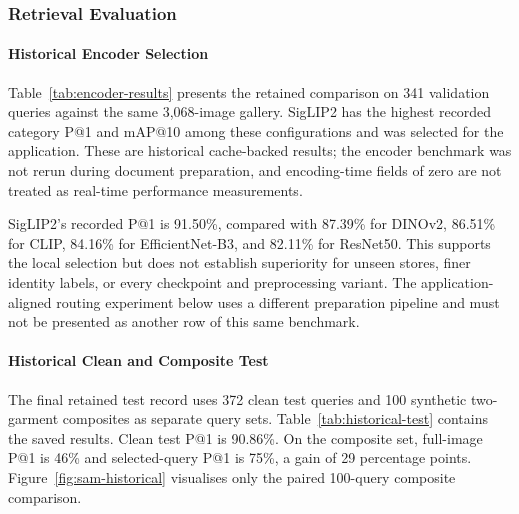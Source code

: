 \subsubsection{Retrieval Evaluation}
\paragraph{Historical Encoder Selection}
Table~\ref{tab:encoder-results} presents the retained comparison on 341 validation
queries against the same 3,068-image gallery. SigLIP2 has the highest recorded
category P@1 and mAP@10 among these configurations and was selected for the
application. These are historical cache-backed results; the encoder benchmark
was not rerun during document preparation, and encoding-time fields of zero
are not treated as real-time performance measurements.

\begin{table}[H]\centering
\caption{Retained five-encoder comparison: category relevance, 341 validation queries}
\label{tab:encoder-results}
\begin{ReportTable}\end{ReportTable}
\end{table}

SigLIP2's recorded P@1 is 91.50\%, compared with 87.39\% for DINOv2, 86.51\% for
CLIP, 84.16\% for EfficientNet-B3, and 82.11\% for ResNet50. This supports the
local selection but does not establish superiority for unseen stores, finer
identity labels, or every checkpoint and preprocessing variant. The application-
aligned routing experiment below uses a different preparation pipeline and must
not be presented as another row of this same benchmark.

\paragraph{Historical Clean and Composite Test}
The final retained test record uses 372 clean test queries and 100 synthetic
two-garment composites as separate query sets. Table~\ref{tab:historical-test}
contains the saved results. Clean test P@1 is 90.86\%. On the composite set,
full-image P@1 is 46\% and selected-query P@1 is 75\%, a gain of 29 percentage
points. Figure~\ref{fig:sam-historical} visualises only the paired 100-query
composite comparison.

\begin{table}[H]\centering
\caption{Historical test results with category-based relevance}
\label{tab:historical-test}
\begin{ReportTable}\end{ReportTable}
\end{table}

